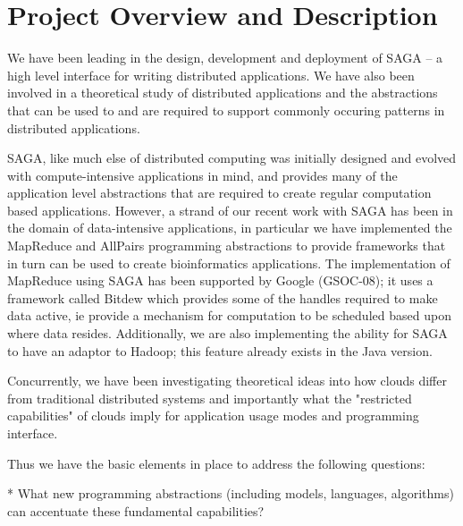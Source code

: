 \documentclass[10pt,letterpaper]{article}
\begin{document}



\setcounter{page}{1}
\pagestyle{plain} 
\normalsize


\section{Project Overview and Description}


We have been leading in the design, development and deployment of SAGA -- a high level
interface for writing distributed applications.  We have also been involved in
a theoretical study of distributed applications and the abstractions that can be used to
and are required to support commonly occuring patterns in distributed applications.

SAGA, like much else of distributed computing was initially designed and evolved with 
compute-intensive applications in mind, and provides many of the application level
abstractions that are required to create regular computation based applications.
However, a strand of our recent work with SAGA has been in the domain of
data-intensive applications, in particular we have implemented the
MapReduce and AllPairs  programming abstractions to provide 
frameworks that in turn can be used to create bioinformatics applications.
The implementation of MapReduce using SAGA has been supported by Google (GSOC-08); it uses a
framework called Bitdew which provides some of the handles required to make data
active, ie provide a mechanism for computation to be scheduled based upon where
data resides. Additionally, we are also implementing the ability for SAGA to have an adaptor to 
Hadoop; this feature already exists in the Java version. 

Concurrently, we have been investigating theoretical ideas into how clouds differ
from traditional distributed systems and importantly what the "restricted capabilities"
of clouds imply for application usage modes and programming interface. 

Thus we have the basic elements in place to address the following questions:

* What new programming abstractions (including models, languages, algorithms) can accentuate these fundamental capabilities?
\end{document}
